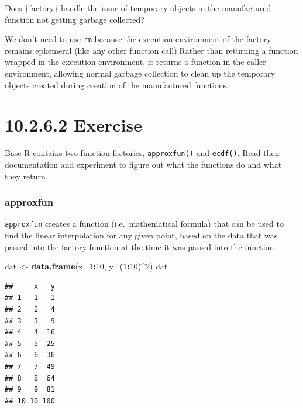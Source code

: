 \documentclass[]{book}
\newenvironment{Shaded}{\begin{snugshade}}{\end{snugshade}}
\newcommand{\DataTypeTok}[1]{\textcolor[rgb]{0.13,0.29,0.53}{#1}}
\newcommand{\DecValTok}[1]{\textcolor[rgb]{0.00,0.00,0.81}{#1}}
\newcommand{\FloatTok}[1]{\textcolor[rgb]{0.00,0.00,0.81}{#1}}
\newcommand{\KeywordTok}[1]{\textcolor[rgb]{0.13,0.29,0.53}{\textbf{#1}}}
\newcommand{\NormalTok}[1]{#1}
\newcommand{\OperatorTok}[1]{\textcolor[rgb]{0.81,0.36,0.00}{\textbf{#1}}}
\newcommand{\StringTok}[1]{\textcolor[rgb]{0.31,0.60,0.02}{#1}}
\begin{document}
Does \{factory\} handle the issue of temporary objects in the manufactured function not getting garbage collected?

We don't need to use \texttt{rm} because the execution environment of the factory remains ephemeral (like any other function call).Rather than returning a function wrapped in the execution environment, it returns a function in the caller environment, allowing normal garbage collection to clean up the temporary objects created during creation of the manufactured functions.

\hypertarget{exercise-13}{%
\section*{10.2.6.2 Exercise}\label{exercise-13}}

Base R contains two function factories, \texttt{approxfun()} and \texttt{ecdf()}. Read their documentation and experiment to figure out what the functions do and what they return.

\hypertarget{approxfun}{%
\subsubsection*{approxfun}\label{approxfun}}

\texttt{approxfun} creates a function (i.e.~mathematical formula) that can be used to find the linear interpolation for any given point, based on the data that was passed into the factory-function at the time it was passed into the function

\begin{Shaded}
\begin{Highlighting}[]
\NormalTok{dat <-}\StringTok{ }\KeywordTok{data.frame}\NormalTok{(}\DataTypeTok{x=}\DecValTok{1}\OperatorTok{:}\DecValTok{10}\NormalTok{, }\DataTypeTok{y=}\NormalTok{(}\DecValTok{1}\OperatorTok{:}\DecValTok{10}\NormalTok{)}\OperatorTok{^}\DecValTok{2}\NormalTok{)}
\NormalTok{dat}
\end{Highlighting}
\end{Shaded}

\begin{verbatim}
##     x   y
## 1   1   1
## 2   2   4
## 3   3   9
## 4   4  16
## 5   5  25
## 6   6  36
## 7   7  49
## 8   8  64
## 9   9  81
## 10 10 100
\end{verbatim}

\begin{Shaded}
\end{Shaded}
\end{document}
